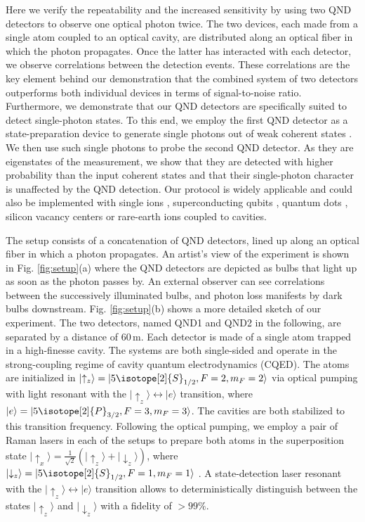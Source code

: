 \documentclass[prl,twocolumn,amsmath,amssymb,bibnotes,aps,longbibliography]{revtex4-1}
\newcommand{\ket}[1]{|{#1}\rangle}
\begin{document}
Here we verify the repeatability and the increased sensitivity by using two QND detectors to observe one optical photon twice. The two devices, each made from a single atom coupled to an optical cavity, are distributed along an optical fiber in which the photon propagates. Once the latter has interacted with each detector, we observe correlations between the detection events. These correlations are the key element behind our demonstration that the combined system of two detectors outperforms both individual devices in terms of signal-to-noise ratio. Furthermore, we demonstrate that our QND detectors are specifically suited to detect single-photon states. To this end, we employ the first QND detector as a state-preparation device to generate single photons out of weak coherent states \cite{daiss2019}. We then use such single photons to probe the second QND detector. As they are eigenstates of the measurement, we show that they are detected with higher probability than the input coherent states and that their single-photon character is unaffected by the QND detection. Our protocol is widely applicable and could also be implemented with single ions \cite{mundt2002, takahashi2020}, superconducting qubits \cite{kono2018quantum, besse2018}, quantum dots \cite{fushman2008, kim2013, desantis2017}, silicon vacancy centers \cite{bhaskar2020} or rare-earth ions \cite{chen2020} coupled to cavities.

The setup consists of a concatenation of QND detectors, lined up along an optical fiber in which a photon propagates. An artist's view of the experiment is shown in Fig. \ref{fig:setup}(a) where the QND detectors are depicted as bulbs that light up as soon as the photon passes by. An external observer can see correlations between the successively illuminated bulbs, and photon loss manifests by dark bulbs downstream. Fig. \ref{fig:setup}(b) shows a more detailed sketch of our experiment. The two detectors, named QND1 and QND2 in the following, are separated by a distance of $60\,\mathrm{m}$. Each detector is made of a single  atom trapped in a high-finesse cavity. The systems are both single-sided and operate in the strong-coupling regime of cavity quantum electrodynamics (CQED). The atoms are initialized in $\ket{\uparrow_z}=\ket{5\isotope[2]{S}_{1/2}, F=2, m_F=2}$ via optical pumping with light resonant with the $\ket{\uparrow_z}\leftrightarrow \ket{e}$ transition, where $\ket{e}=\ket{5\isotope[2]{P}_{3/2}, F=3, m_F=3}$. The cavities are both stabilized to this transition frequency. Following the optical pumping, we employ a pair of Raman lasers in each of the setups to prepare both atoms in the
superposition state $\ket{\uparrow_x}=\frac{1}{\sqrt{2}}(\ket{\uparrow_z}+\ket{\downarrow_z})$, where $\ket{\downarrow_z}=\ket{5\isotope[2]{S}_{1/2}, F=1, m_F=1}$ \cite{reiserer2013}. A state-detection laser resonant with the $\ket{\uparrow_z}\leftrightarrow\ket{e}$ transition allows to deterministically distinguish between the states $\ket{\uparrow_z}$ and $\ket{\downarrow_z}$ with a fidelity of $>99\%$.
\end{document}
